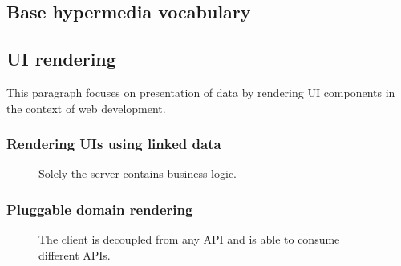 \subsection{Base hypermedia vocabulary}\label{basevocab}

\subsection{UI rendering}\label{genericrendering}

This paragraph focuses on presentation of data by rendering UI components in the context of web development.


\subsubsection{Rendering UIs using linked data}\label{linkeddatarendering}

\begin{figure}[!htb]
  \caption{\label{fig:my-label} Solely the server contains business logic.}
\end{figure}

\subsubsection{Pluggable domain rendering}\label{domainrendering}

\begin{figure}[!htb]
  \caption{\label{fig:my-label} The client is decoupled from any API and is able to consume different APIs.}
\end{figure}

